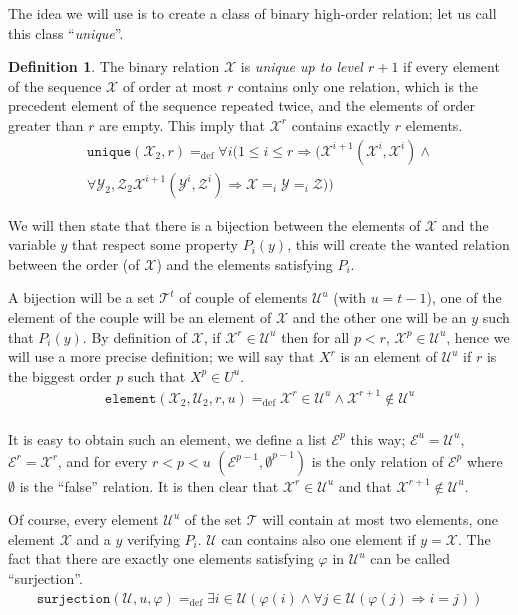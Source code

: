 \documentclass[a4paper,12pt]{article}
\newcommand{\emphdex}[1]{\index{#1}\emph{#1}}
\theoremstyle{definition}
\newtheorem{definition}[theorem]{Definition}
\renewcommand{\phi}{\varphi}
\newcommand{\mc}{\mathcal}
\newcommand{\ed}{=_{\mathrm{def}}}
\begin{document}
The idea we will use is to create a class of binary high-order
relation; let us call this class ``\emphdex{unique}''.

\begin{definition}
  The binary relation $\mc X$ is \emph{unique up to level $r+1$} if every
  element of the sequence $\mc X$ of order at most $r$ contains only
  one relation, which is the precedent element of the sequence
  repeated twice, and the elements of order greater than $r$ are
  empty. This imply that $\mc X^r$ contains exactly $r$ elements.
\begin{eqnarray}
  \texttt{unique}(\mc X_{2},r)\ed\forall i(1\le i\le r\Rightarrow(\mc X^{i+1}(\mc X^{i},\mc X^{i})\land \nonumber\\\forall \mc Y_{2},\mc Z_{2}\mc X^{i+1}(\mc Y^{i},\mc Z^{i} )\Rightarrow \mc X=_i\mc Y=_i\mc Z))
\end{eqnarray}
\end{definition}
We will then state that there is a bijection between the elements of
$\mc X$ and the variable $y$ that respect some property $P_i(y)$, this
will create the wanted relation between the order (of $\mc X$) and the
elements satisfying $P_i$.

A bijection will be a set $\mc T^t$ of couple of elements $\mc U^u$
(with $u=t-1$), one of the element of the couple will be an element of
$\mc X$ and the other one will be an $y$ such that $P_i(y)$. By
definition of $\mc X$, if $\mc X^r\in \mc U^u$ then for all $p<r$,
$\mc X^p\in \mc U^u$, hence we will use a more precise definition; we
will say that $X^r$ is an element of $\mc U^u$ if $r$ is the biggest
order $p$ such that $X^p\in U^u$.
 \begin{eqnarray*}\label{eq:element}
   \texttt{element}(\mc X_{2},\mc U_{2},r,u)\ed \mc X^r\in \mc U^u\land \mc X^{r+1}\notin \mc U^u\\
 \end{eqnarray*}

 It is easy to obtain such an element, we define a list $\mc E^{p}$
 this way; $\mc E^{u}=\mc U^{u}$, $\mc E^{r}=\mc X^{r}$, and for every
 $r<p<u$ $(\mc E^{p-1},\emptyset^{p-1})$ is the only relation of $\mc
 E^{p}$ where $\emptyset$ is the ``false'' relation. It is then clear
 that $\mc X^{r}\in \mc U^{u}$ and that $\mc X^{r+1}\notin \mc U^{u}$.

 Of course, every element $\mc U^u$ of the set $\mc T$ will contain
 at most two elements, one element $\mc X$ and a $y$ verifying
 $P_i$. $\mc U$ can contains also one element if $y=\mc X$. The fact
 that there are exactly one elements satisfying $\phi$ in $\mc U^{u}$
 can be called ``surjection''. \begin{eqnarray*}
  \texttt{surjection}(\mc U,u,\phi)\ed \exists i\in \mc U(\phi(i)\land\forall j\in \mc U(\phi(j)\Rightarrow i=j))
\end{eqnarray*}
\end{document}
